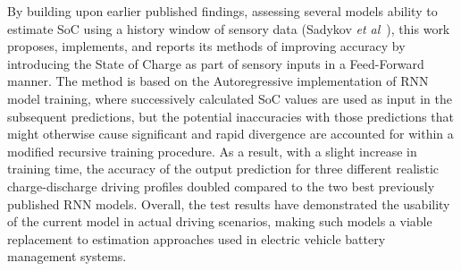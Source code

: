{        By building upon earlier published findings, assessing several models ability to estimate SoC using a history window of sensory data (Sadykov \textit{et al}~\cite{sadykov_practical_2022}), this work proposes, implements, and reports its methods of improving accuracy by introducing the State of Charge as part of sensory inputs in a Feed-Forward manner.
        The method is based on the Autoregressive implementation of RNN model training, where successively calculated SoC values are used as input in the subsequent predictions, but the potential inaccuracies with those predictions that might otherwise cause significant and rapid divergence are accounted for within a modified recursive training procedure.
        As a result, with a slight increase in training time, the accuracy of the output prediction for three different realistic charge-discharge driving profiles doubled compared to the two best previously published RNN models.
        Overall, the test results have demonstrated the usability of the current model in actual driving scenarios, making such models a viable replacement to estimation approaches used in electric vehicle battery management systems.
}
